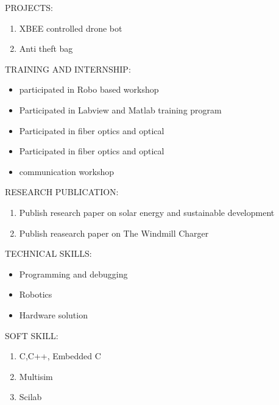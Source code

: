 \documentclass[11pt,a4paper]{article}
\begin{document}
\begin{flushleft}
		\textsf{PROJECTS:}\\
		\begin{enumerate}
			\item  XBEE controlled drone bot
			\item  Anti theft bag
		\end{enumerate}
			\textsf{TRAINING AND INTERNSHIP:}\\
			\begin{itemize}
				\item  participated in Robo based workshop\\
				\item  Participated in Labview and Matlab training program\\
				\item  Participated in fiber optics and optical\\
				\item  Participated in fiber optics and optical\\
				\item communication workshop
			\end{itemize}
				\textsf{RESEARCH PUBLICATION:}
				\begin{enumerate}
					\item Publish research paper on solar energy and sustainable development\\ 
					\item Publish reasearch paper on The Windmill Charger\\ 
				\end{enumerate} 
			\textsf{TECHNICAL SKILLS:}\\
			\begin{itemize}
				\item Programming and debugging\\
				\item Robotics \\
				\item Hardware solution\\
			\end{itemize}
				\textsf{SOFT SKILL:}\\
				\begin{enumerate}
					\item C,C++, Embedded C\\
					\item Multisim\\
					\item Scilab\\
	          \end{enumerate}
\end{flushleft}

 
\end{document}
